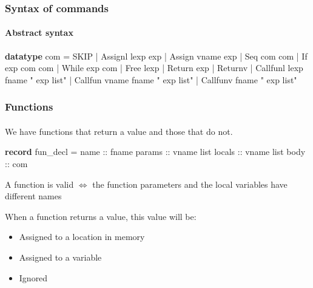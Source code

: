 \begin{frame}[fragile]
\frametitle{Syntax of commands}
\framesubtitle{Abstract syntax}

\begin{semiverbatim}
\textbf{datatype} com = SKIP
             | Assignl lexp exp
             | Assign  vname exp
             | Seq     com  com
             | If      exp com com
             | While   exp com
             | Free    lexp
             | Return exp
             | Returnv
             | Callfunl lexp fname " exp list"
             | Callfun vname fname " exp list"
             | Callfunv fname " exp list"
\end{semiverbatim}

\end{frame}


\begin{frame}[fragile]
\frametitle{Functions}
\framesubtitle{}

We have functions that return a value and those that do not.

\begin{semiverbatim}
\textbf{record} fun_decl =
  name :: fname
  params :: vname list
  locals :: vname list
  body :: com
\end{semiverbatim}

\bigskip

A function is valid $\Longleftrightarrow$ the function parameters and the local variables have different names

\bigskip

When a function returns a value, this value will be:

\begin{itemize}
\item{Assigned to a location in memory}
\item{Assigned to a variable}
\item{Ignored}
\end{itemize}


\end{frame}


